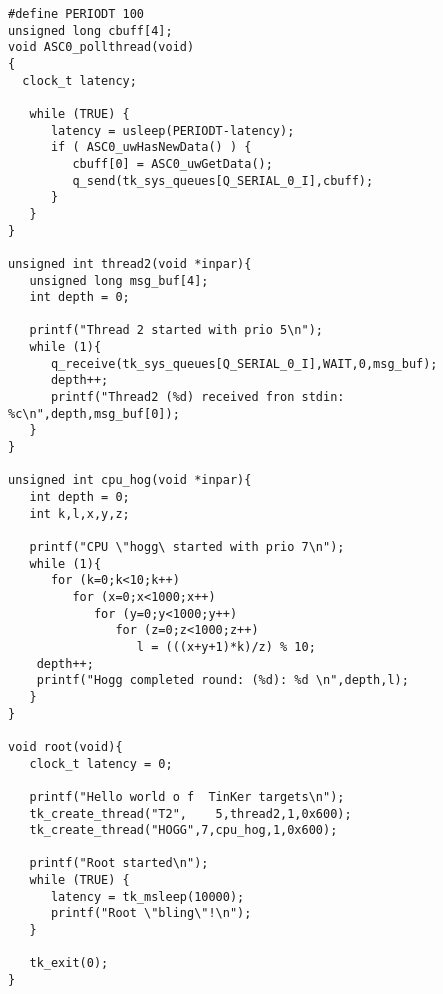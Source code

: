 \begin{table}[!hbp]
\begin{verbatim}
#define PERIODT 100
unsigned long cbuff[4];
void ASC0_pollthread(void)
{
  clock_t latency;
  
   while (TRUE) {
      latency = usleep(PERIODT-latency); 
      if ( ASC0_uwHasNewData() ) {
         cbuff[0] = ASC0_uwGetData();
         q_send(tk_sys_queues[Q_SERIAL_0_I],cbuff);
      }
   }
}

unsigned int thread2(void *inpar){
   unsigned long msg_buf[4];
   int depth = 0;

   printf("Thread 2 started with prio 5\n");
   while (1){
      q_receive(tk_sys_queues[Q_SERIAL_0_I],WAIT,0,msg_buf);
      depth++;
      printf("Thread2 (%d) received fron stdin: %c\n",depth,msg_buf[0]);
   }
}

unsigned int cpu_hog(void *inpar){
   int depth = 0;
   int k,l,x,y,z;

   printf("CPU \"hogg\ started with prio 7\n");
   while (1){
      for (k=0;k<10;k++)
         for (x=0;x<1000;x++)
            for (y=0;y<1000;y++)
               for (z=0;z<1000;z++)
                  l = (((x+y+1)*k)/z) % 10;
    depth++;
    printf("Hogg completed round: (%d): %d \n",depth,l);
   }
}

void root(void){
   clock_t latency = 0;

   printf("Hello world o f  TinKer targets\n");
   tk_create_thread("T2",    5,thread2,1,0x600);
   tk_create_thread("HOGG",7,cpu_hog,1,0x600);

   printf("Root started\n");
   while (TRUE) {
      latency = tk_msleep(10000);
      printf("Root \"bling\"!\n");
   }

   tk_exit(0);
}
\end{verbatim}
\caption{Events determined by polling.\label{poll}}
\end{table}

